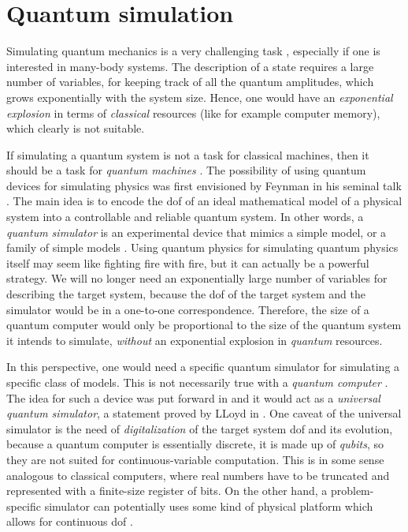 \section{Quantum simulation}
\label{sec:quantum_simulation}

Simulating quantum mechanics is a very challenging task \cite{manin1980computable, feynman1982simulation}, especially if one is interested in many-body systems.
The description of a state requires a large number of variables, for keeping track of all the quantum amplitudes, which grows exponentially with the system size.
Hence, one would have an \emph{exponential explosion} in terms of \emph{classical} resources (like for example computer memory), which clearly is not suitable.

If simulating a quantum system is not a task for classical machines, then it should be a task for \emph{quantum machines} \cite{feynman1982simulation, georgescu2014simulation, hauke2012simulators, kendon2010quantum, buluta2009simulators}.
The possibility of using quantum devices for simulating physics was first envisioned by Feynman in his seminal talk \cite{feynman1982simulation}.
The main idea is to encode the \ac{dof} of an ideal mathematical model of a physical system into a controllable and reliable quantum system.
In other words, a \emph{quantum simulator} is an experimental device that mimics a simple model, or a family of simple models \cite{hauke2012simulators}.
Using quantum physics for simulating quantum physics itself may seem like fighting fire with fire, but it can actually be a powerful strategy.
We will no longer need an exponentially large number of variables for describing the target system, because the \ac{dof} of the target system and the simulator would be in a one-to-one correspondence.
Therefore, the size of a quantum computer would only be proportional to the size of the quantum system it intends to simulate, \emph{without} an exponential explosion in \emph{quantum} resources.

In this perspective, one would need a specific quantum simulator for simulating a specific class of models.
This is not necessarily true with a \emph{quantum computer} \cite{feynman1985quantum, nielsen2010quantum, schleich2007elements, stolze2008quantum}.
The idea for such a device was put forward in \cite{manin1980computable, feynman1982simulation, feynman1985quantum} and it would act as a \emph{universal quantum simulator}, a statement proved by LLoyd in \cite{lloyd1996simulator}.
One caveat of the universal simulator is the need of \emph{digitalization} of the target system \ac{dof} and its evolution, because a quantum computer is essentially discrete, it is made up of \emph{qubits}, so they are not suited for continuous-variable computation.
This is in some sense analogous to classical computers, where real numbers have to be truncated and represented with a finite-size register of bits.
On the other hand, a problem-specific simulator can potentially uses some kind of physical platform which allows for continuous \ac{dof} \cite{kendon2010quantum, wagner2010continuous}.

